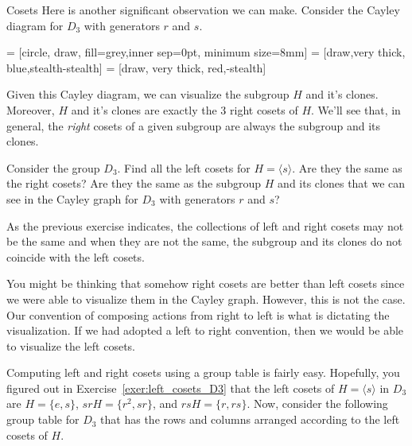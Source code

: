 \begin{section}{Cosets}
Here is another significant observation we can make.  Consider the Cayley diagram for \(D_3\) with generators \(r\) and \(s\).

 = [circle, draw, fill=grey,inner sep=0pt, minimum size=8mm]
 = [draw,very  thick, blue,stealth-stealth]
 = [draw, very thick, red,-stealth]

\begin{center}
\end{center}
Given this Cayley diagram, we can visualize the subgroup \(H\) and it's clones.  Moreover, \(H\) and it's clones are exactly the 3 right cosets of \(H\).  We'll see that, in general, the \emph{right} cosets of a given subgroup are always the subgroup and its clones.

\begin{exercise}\label{exer:left_cosets_D3}
Consider the group \(D_3\).  Find all the left cosets for \(H=\langle s\rangle\).  Are they the same as the right cosets?  Are they the same as the subgroup \(H\) and its clones that we can see in the Cayley graph for \(D_3\) with generators \(r\) and \(s\)?
\end{exercise}

As the previous exercise indicates, the collections of left and right cosets may not be the same and when they are not the same, the subgroup and its clones do not coincide with the left cosets.

You might be thinking that somehow right cosets are better than left cosets since we were able to visualize them in the Cayley graph.  However, this is not the case.  Our convention of composing actions from right to left is what is dictating the visualization.  If we had adopted a left to right convention, then we would be able to visualize the left cosets.  

Computing left and right cosets using a group table is fairly easy.  Hopefully, you figured out in Exercise~\ref{exer:left_cosets_D3} that the left cosets of \(H=\langle s\rangle\) in \(D_3\) are \(H=\{e,s\}\), \(srH=\{r^2,sr\}\), and \(rsH=\{r,rs\}\).  Now, consider the following group table for \(D_3\) that has the rows and columns arranged according to the left cosets of \(H\).


\end{section}
